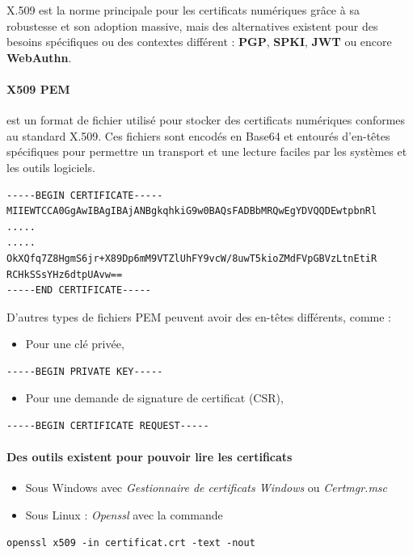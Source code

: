 \documentclass[french, 12pt]{article}%
\newcommand{\itemE}{\item[$\bullet$]}
\begin{document}
X.509 est la norme principale pour les certificats numériques grâce à sa robustesse et son adoption massive, mais des alternatives existent pour des besoins spécifiques ou des contextes différent : \textbf{PGP}, \textbf{SPKI}, \textbf{JWT} ou encore \textbf{WebAuthn}. 


\paragraph{X509 PEM} est un format de fichier utilisé pour stocker des certificats numériques conformes au standard X.509. Ces fichiers sont encodés en Base64 et entourés d'en-têtes spécifiques pour permettre un transport et une lecture faciles par les systèmes et les outils logiciels.


\begin{lstlisting}[style=commande]
-----BEGIN CERTIFICATE-----
MIIEWTCCA0GgAwIBAgIBAjANBgkqhkiG9w0BAQsFADBbMRQwEgYDVQQDEwtpbnRl
.....
.....
OkXQfq7Z8HgmS6jr+X89Dp6mM9VTZlUhFY9vcW/8uwT5kioZMdFVpGBVzLtnEtiR
RCHkSSsYHz6dtpUAvw==
-----END CERTIFICATE-----
\end{lstlisting}  

D'autres types de fichiers PEM peuvent avoir des en-têtes différents, comme :
\begin{itemize}
\itemE Pour une clé privée, 
\end{itemize} 
\begin{lstlisting}[style=commande]
-----BEGIN PRIVATE KEY-----
\end{lstlisting}
\begin{itemize}
\itemE Pour une demande de signature de certificat (CSR),
\end{itemize}
\begin{lstlisting}[style=commande]
-----BEGIN CERTIFICATE REQUEST-----
\end{lstlisting}

\paragraph{Des outils existent pour pouvoir lire les certificats} 
\begin{itemize}
\itemE Sous Windows avec \textit{Gestionnaire de certificats Windows} ou \textit{Certmgr.msc} 
\itemE Sous Linux : \textit{Openssl} avec la commande
\end{itemize} 

\begin{lstlisting}[style=commande]
openssl x509 -in certificat.crt -text -nout
\end{lstlisting}
\end{document}

